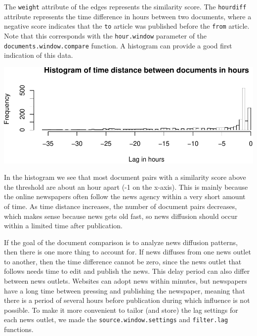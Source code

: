 \documentclass[]{article}
\newenvironment{Shaded}{\begin{snugshade}}{\end{snugshade}}
\newcommand{\KeywordTok}[1]{\textcolor[rgb]{0.13,0.29,0.53}{\textbf{{#1}}}}
\newcommand{\DataTypeTok}[1]{\textcolor[rgb]{0.13,0.29,0.53}{{#1}}}
\newcommand{\DecValTok}[1]{\textcolor[rgb]{0.00,0.00,0.81}{{#1}}}
\newcommand{\StringTok}[1]{\textcolor[rgb]{0.31,0.60,0.02}{{#1}}}
\newcommand{\NormalTok}[1]{{#1}}
\begin{document}
The \texttt{weight} attribute of the edges represents the similarity
score. The \texttt{hourdiff} attribute represents the time difference in
hours between two documents, where a negative score indicates that the
\texttt{to} article was published before the \texttt{from} article. Note
that this corresponds with the \texttt{hour.window} parameter of the
\texttt{documents.window.compare} function. A histogram can provide a
good first indication of this data.

\begin{Shaded}
\end{Shaded}

\includegraphics{vignette_files/figure-latex/unnamed-chunk-10-1.pdf}

In the histogram we see that most document pairs with a similarity score
above the threshold are about an hour apart (-1 on the x-axis). This is
mainly because the online newspapers often follow the news agency within
a very short amount of time. As time distance increases, the number of
document pairs decreases, which makes sense because news gets old fast,
so news diffusion should occur within a limited time after publication.

If the goal of the document comparison is to analyze news diffusion
patterns, then there is one more thing to account for. If news diffuses
from one news outlet to another, then the time difference cannot be
zero, since the news outlet that follows needs time to edit and publish
the news. This delay period can also differ between news outlets.
Websites can adopt news within minutes, but newspapers have a long time
between pressing and publishing the newspaper, meaning that there is a
period of several hours before publication during which influence is not
possible. To make it more convenient to tailor (and store) the lag
settings for each news outlet, we made the
\texttt{source.window.settings} and \texttt{filter.lag} functions.
\end{document}
